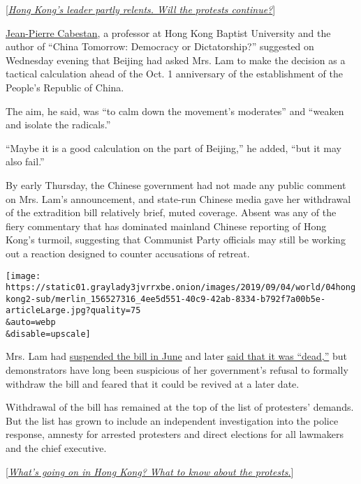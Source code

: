 {[}\href{https://www.nytimes3xbfgragh.onion/2019/09/04/world/asia/hong-kong-carrie-lam-protests.html}{\emph{Hong
Kong's leader partly relents. Will the protests continue?}}{]}

\href{http://gis.hkbu.edu.hk/staff/cabestan.html}{Jean-Pierre Cabestan},
a professor at Hong Kong Baptist University and the author of ``China
Tomorrow: Democracy or Dictatorship?'' suggested on Wednesday evening
that Beijing had asked Mrs. Lam to make the decision as a tactical
calculation ahead of the Oct. 1 anniversary of the establishment of the
People's Republic of China.

The aim, he said, was ``to calm down the movement's moderates'' and
``weaken and isolate the radicals.''

``Maybe it is a good calculation on the part of Beijing,'' he added,
``but it may also fail.''

By early Thursday, the Chinese government had not made any public
comment on Mrs. Lam's announcement, and state-run Chinese media gave her
withdrawal of the extradition bill relatively brief, muted coverage.
Absent was any of the fiery commentary that has dominated mainland
Chinese reporting of Hong Kong's turmoil, suggesting that Communist
Party officials may still be working out a reaction designed to counter
accusations of retreat.

\texttt{[image: https://static01.graylady3jvrrxbe.onion/images/2019/09/04/world/04hongkong2-sub/merlin\_156527316\_4ee5d551-40c9-42ab-8334-b792f7a00b5e-articleLarge.jpg?quality=75\\\&auto=webp\\\&disable=upscale]}

Mrs. Lam had
\href{https://www.nytimes3xbfgragh.onion/2019/06/15/world/asia/hong-kong-protests-extradition-law.html}{suspended
the bill in June} and later
\href{https://www.nytimes3xbfgragh.onion/2019/07/08/world/asia/carrie-lam-hong-kong.html}{said
that it was ``dead,''} but demonstrators have long been suspicious of
her government's refusal to formally withdraw the bill and feared that
it could be revived at a later date.

Withdrawal of the bill has remained at the top of the list of
protesters' demands. But the list has grown to include an independent
investigation into the police response, amnesty for arrested protesters
and direct elections for all lawmakers and the chief executive.

{[}\emph{\href{https://www.nytimes3xbfgragh.onion/2019/08/08/world/asia/hong-kong-protests-explained.html}{What's
going on in Hong Kong? What to know about the
protests}}\href{https://www.nytimes3xbfgragh.onion/2019/08/08/world/asia/hong-kong-protests-explained.html}{.}{]}

